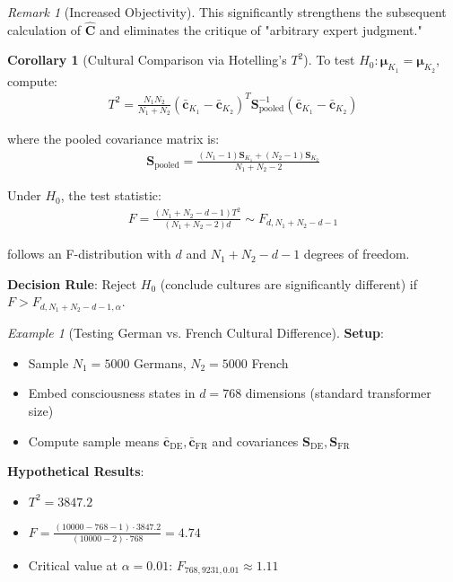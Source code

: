 \documentclass[11pt,a4paper]{article}
\theoremstyle{definition}
\newtheorem{corollary}{Corollary}[section]
\theoremstyle{remark}
\newtheorem{remark}{Remark}[section]
\newtheorem{example}{Example}[section]
\newcommand{\cc}{\mathbf{c}}
\begin{document}
\begin{small}
\begin{remark}[Increased Objectivity]
This significantly strengthens the subsequent calculation of \(\hat{\mathbf{C}}\) and eliminates the critique of "arbitrary expert judgment."
\end{remark}

\begin{corollary}[Cultural Comparison via Hotelling's \(T^2\)]
To test \(H_0: \boldsymbol{\mu}_{K_1} = \boldsymbol{\mu}_{K_2}\), compute:
\begin{align}
T^2 = \frac{N_1 N_2}{N_1 + N_2}(\bar{\cc}_{K_1} - \bar{\cc}_{K_2})^T \mathbf{S}_{\text{pooled}}^{-1} (\bar{\cc}_{K_1} - \bar{\cc}_{K_2})
\end{align}

where the pooled covariance matrix is:
\begin{align}
\mathbf{S}_{\text{pooled}} = \frac{(N_1-1)\mathbf{S}_{K_1} + (N_2-1)\mathbf{S}_{K_2}}{N_1 + N_2 - 2}
\end{align}

Under \(H_0\), the test statistic:
\begin{align}
F = \frac{(N_1+N_2-d-1)T^2}{(N_1+N_2-2)d} \sim F_{d, N_1+N_2-d-1}
\end{align}

follows an F-distribution with \(d\) and \(N_1+N_2-d-1\) degrees of freedom.

\textbf{Decision Rule}: Reject \(H_0\) (conclude cultures are significantly different) if \(F > F_{d, N_1+N_2-d-1, \alpha}\).
\end{corollary}

\begin{example}[Testing German vs. French Cultural Difference]
\textbf{Setup}:
\begin{itemize}
    \item Sample \(N_1 = 5000\) Germans, \(N_2 = 5000\) French
    \item Embed consciousness states in \(d = 768\) dimensions (standard transformer size)
    \item Compute sample means \(\bar{\cc}_{\text{DE}}, \bar{\cc}_{\text{FR}}\) and covariances \(\mathbf{S}_{\text{DE}}, \mathbf{S}_{\text{FR}}\)
\end{itemize}

\textbf{Hypothetical Results}:
\begin{itemize}
    \item \(T^2 = 3847.2\)
    \item \(F = \frac{(10000-768-1) \cdot 3847.2}{(10000-2) \cdot 768} = 4.74\)
    \item Critical value at \(\alpha=0.01\): \(F_{768, 9231, 0.01} \approx 1.11\)
\end{itemize}


\end{example}
\end{small}
\end{document}
